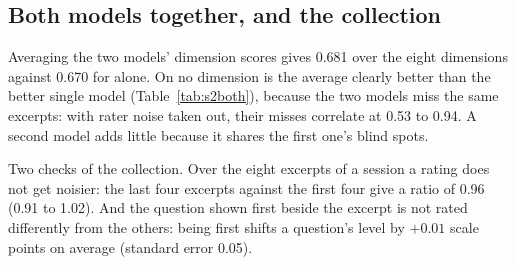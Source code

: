 \subsection{Both models together, and the collection}\label{sec:both}

Averaging the two models' dimension scores gives 0.681 over the eight dimensions against 0.670 for \jev{} alone.
On no dimension is the average clearly better than the better single model (Table~\ref{tab:s2both}), because
the two models miss the same excerpts: with rater noise taken out, their misses correlate at 0.53 to 0.94. A
second model adds little because it shares the first one's blind spots.

Two checks of the collection. Over the eight excerpts of a session a rating does not get noisier: the last four
excerpts against the first four give a ratio of 0.96 (0.91 to 1.02). And the question shown first beside the
excerpt is not rated differently from the others: being first shifts a question's level by $+0.01$ scale points
on average (standard error 0.05).

